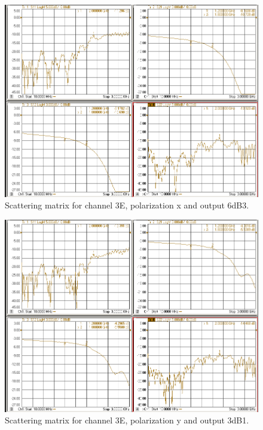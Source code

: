 \documentclass[12pt,a4paper,oneside]{article}
\begin{document}
\begin{figure}[H]
\centering
\includegraphics[width=0.9\linewidth]{VNA_results/3Ex_6dB3.png}
\caption{Scattering matrix for channel 3E, polarization x and output 6dB3.}
\label{fig:3Ex_6dB3}
\end{figure}


\begin{figure}[H]
\centering
\includegraphics[width=0.9\linewidth]{VNA_results/3Ey_3dB1.png}
\caption{Scattering matrix for channel 3E, polarization y and output 3dB1.}
\label{fig:3Ey_3dB1}
\end{figure}
\end{document}
